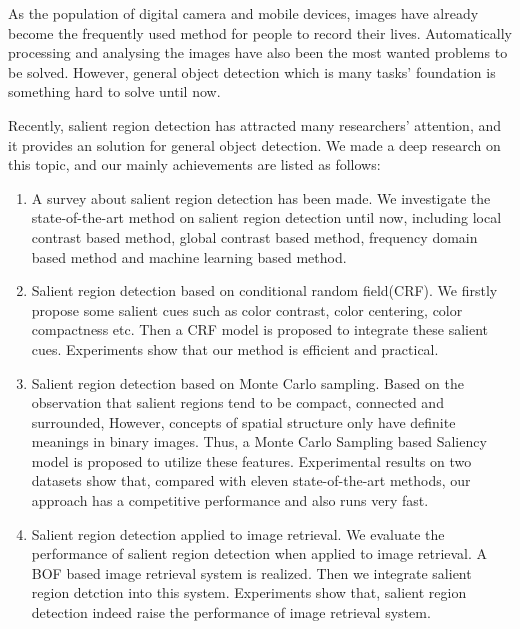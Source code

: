 \begin{englishabstract}

As the population of digital camera and mobile devices, images have already become the frequently used method for people to record their lives. Automatically processing and analysing the images have also been the most wanted problems to be solved. However, general object detection which is many tasks' foundation is something hard to solve until now.

Recently, salient region detection has attracted many researchers' attention, and it provides an solution for general object detection. We made a deep research on this topic, and our mainly achievements are listed as follows:
\begin{enumerate}
  \item A survey about salient region detection has been made. We investigate the state-of-the-art method on salient region detection until now, including local contrast based method, global contrast based method, frequency domain based method and machine learning based method.
  \item Salient region detection based on conditional random field(CRF). We firstly propose some salient cues such as color contrast, color centering, color compactness etc. Then a CRF model is proposed to integrate these salient cues. Experiments show that our method is efficient and practical.
  \item Salient region detection based on Monte Carlo sampling. Based on the observation that salient regions tend to be compact, connected and surrounded, However, concepts of spatial structure only have definite meanings in binary images. Thus, a Monte Carlo Sampling based Saliency model is proposed to utilize these features. Experimental results on two datasets show that, compared with eleven state-of-the-art methods, our approach has a competitive performance and also runs very fast.
  \item Salient region detection applied to image retrieval. We evaluate the performance of salient region detection when applied to image retrieval. A BOF based image retrieval system is realized. Then we integrate salient region detction into this system. Experiments show that, salient region detection indeed raise the performance of image retrieval system.
\end{enumerate}


\end{englishabstract}
